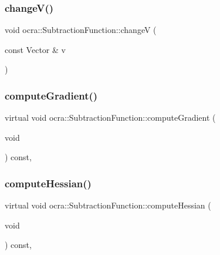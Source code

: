 \subsubsection{\texorpdfstring{change\+V()}{changeV()}}
{\footnotesize\ttfamily void ocra\+::\+Subtraction\+Function\+::changeV (\begin{DoxyParamCaption}\item[{const Vector \&}]{v }\end{DoxyParamCaption})}

\hypertarget{classocra_1_1SubtractionFunction_a117739796f68e8cf8e8931606ff09443}{}\label{classocra_1_1SubtractionFunction_a117739796f68e8cf8e8931606ff09443} 
\subsubsection{\texorpdfstring{compute\+Gradient()}{computeGradient()}}
{\footnotesize\ttfamily virtual void ocra\+::\+Subtraction\+Function\+::compute\+Gradient (\begin{DoxyParamCaption}\item[{void}]{ }\end{DoxyParamCaption}) const\hspace{0.3cm}{\ttfamily [protected]}, {\ttfamily [virtual]}}

\hypertarget{classocra_1_1SubtractionFunction_ac6558a3de7573facbc7a4d1b03128e43}{}\label{classocra_1_1SubtractionFunction_ac6558a3de7573facbc7a4d1b03128e43} 
\subsubsection{\texorpdfstring{compute\+Hessian()}{computeHessian()}}
{\footnotesize\ttfamily virtual void ocra\+::\+Subtraction\+Function\+::compute\+Hessian (\begin{DoxyParamCaption}\item[{void}]{ }\end{DoxyParamCaption}) const\hspace{0.3cm}{\ttfamily [protected]}, {\ttfamily [virtual]}}

\hypertarget{classocra_1_1SubtractionFunction_a2bbae38f5ddcfacb9bc5f4114ffb7b02}{}\label{classocra_1_1SubtractionFunction_a2bbae38f5ddcfacb9bc5f4114ffb7b02} 
